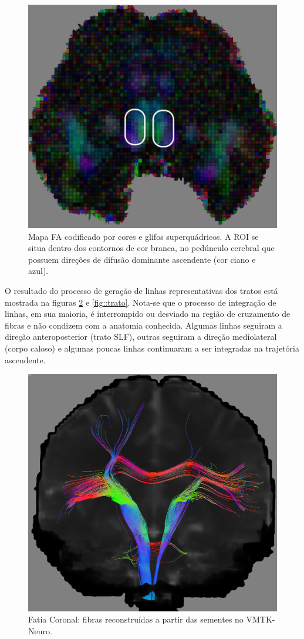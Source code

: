 \documentclass[
    12pt,                %
    oneside,            %
    a4paper,            %
    english,            %
    french,                %
    spanish,            %
    brazil                %
    ]{abntex2}
\begin{document}
\begin{figure}[ht]

    \centering
    \includegraphics[width=.8\linewidth, angle=0]{figs/Tractografia/A27_SQ_3D.png}
    \caption{Mapa FA codificado por cores e glifos superquádricos. A ROI se situa dentro dos contornos de cor branca, no pedúnculo cerebral que possuem direções de difusão dominante ascendente (cor ciano e azul).}
    \label{fig::ROI}
   \hspace{1pt}
\end{figure}



O resultado do processo de geração de linhas representativas dos tratos está mostrada na figuras \ref{fig::DTI_Fatia_Coronal_Trato} e \ref{fig::trato}. Nota-se que o processo de integração de linhas, em sua maioria, é interrompido ou desviado na região de cruzamento de fibras e não condizem com a anatomia conhecida. Algumas linhas seguiram a direção anteroposterior (trato SLF), outras seguiram a direção mediolateral (corpo caloso) e algumas poucas linhas continuaram a ser integradas na trajetória ascendente.

\begin{figure}[ht]

    \centering
    \includegraphics[width=.6\linewidth, angle=0]{figs/Tractografia/Trato_Volume.png}
        \caption{Fatia Coronal: fibras reconstruídas a partir das sementes no VMTK-Neuro.}
    \label{fig::DTI_Fatia_Coronal_Trato}
\end{figure}
\end{document}
